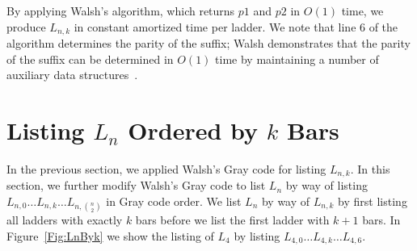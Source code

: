 \begin{theorem}
\begin{theorem}
By applying Walsh's algorithm, which returns $p1$ and $p2$ in $O(1)$ time, we produce $L_{n,k}$ in constant amortized time per ladder. 
We note that line $6$ of the algorithm determines the parity of the suffix; Walsh demonstrates that the parity 
of the suffix can be determined in $O(1)$ time by maintaining a number of auxiliary data structures~\cite{A41}.  


\section{Listing $L_{n}$ Ordered by $k$ Bars}
In the previous section, we applied Walsh's Gray code for listing $L_{n,k}$. In this section, we further modify Walsh's Gray code 
to list $L_{n}$ by way of listing $L_{n,0} \dots L_{n,k} \dots L_{n, {n \choose 2}}$ in Gray code order. 
We list $L_{n}$ by way of $L_{n,k}$ by first listing all ladders with exactly $k$ bars before we list the first ladder with $k+1$ bars. In Figure~\ref{Fig:LnByk} we show the 
listing of $L_{4}$ by listing $L_{4,0} \dots L_{4, k} \dots L_{4, 6}$.\par 

\begin{figure}[htp]
  \centering
{}
\end{figure}
\end{theorem}
\end{theorem}
